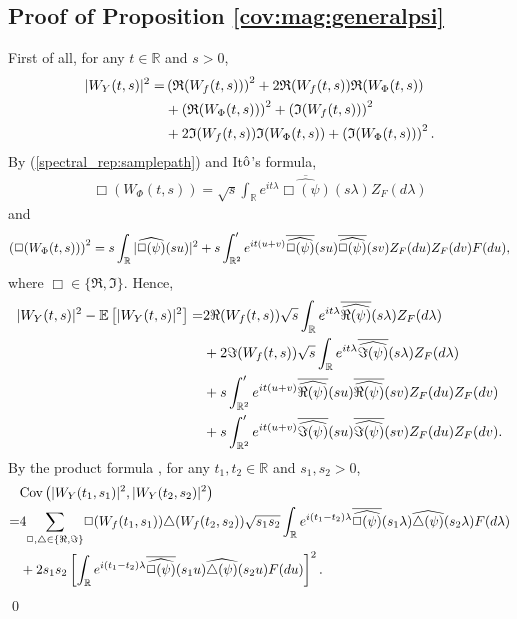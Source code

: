 \documentclass{amsart}
\begin{document}
\subsection{Proof of Proposition \ref{cov:mag:generalpsi}}\label{sec:proof:cov:mag:generalpsi}
First of all, for any $t\in \mathbb{R}$ and $s>0$,
\begin{align}\notag
|W_{Y}(t,s)|^2
=& \left(\mathfrak{R}(W_{f}(t,s))\right)^{2}+ 2\mathfrak{R}(W_{f}(t,s)) \mathfrak{R}(W_{\Phi}(t,s))
\\\notag&
+\left( \mathfrak{R}(W_{\Phi}(t,s))\right)^{2}
+\left(\mathfrak{I}(W_{f}(t,s))\right)^{2}
\\\notag&+ 2\mathfrak{I}(W_{f}(t,s)) \mathfrak{I}(W_{\Phi}(t,s))+\left( \mathfrak{I}(W_{\Phi}(t,s))\right)^{2}.
\end{align}
By (\ref{spectral_rep:samplepath}) and It$\hat{\textup{o}}$'s formula,
\begin{align*}%
\Box(W_{\Phi}(t,s))
= \sqrt{s}\int_{\mathbb{R}}e^{it\lambda} \overline{\widehat{\Box(\psi)}}(s\lambda)Z_{F}(d\lambda)
\end{align*}
and
\begin{align}\notag
\left(\Box(W_{\Phi}(t,s))\right)^2 = s\int_{\mathbb{R}}|\widehat{\Box(\psi)}(su)|^2
+s\int_{\mathbb{R}^{2}}'e^{it(u+v)} \overline{\widehat{\Box(\psi)}}(su)
\overline{\widehat{\Box(\psi)}}(sv)Z_{F}(du)Z_{F}(dv)
F(du),
\end{align}
where $\Box\in \{\Re,\Im\}.$
Hence,
\begin{align}\notag
|W_{Y}(t,s)|^2-\mathbb{E}\left[|W_{Y}(t,s)|^2\right]
=&
 2\Re(W_{f}(t,s))\sqrt{s}\int_{\mathbb{R}}e^{it\lambda} \overline{\widehat{\Re(\psi)}}(s\lambda)Z_{F}(d\lambda)
\\\notag&+ 2\Im(W_{f}(t,s))\sqrt{s}\int_{\mathbb{R}}e^{it\lambda} \overline{\widehat{\Im(\psi)}}(s\lambda)Z_{F}(d\lambda)
\\\notag&+s\int_{\mathbb{R}^{2}}'e^{it(u+v)} \overline{\widehat{\Re(\psi)}}(su)
\overline{\widehat{\Re(\psi)}}(sv)Z_{F}(du)Z_{F}(dv)
\\\notag&+s\int_{\mathbb{R}^{2}}'e^{it(u+v)} \overline{\widehat{\Im(\psi)}}(su)
\overline{\widehat{\Im(\psi)}}(sv)Z_{F}(du)Z_{F}(dv).
\end{align}
By the product formula \cite{major1981lecture,nourdin2012normal}, for any $t_{1},t_{2}\in \mathbb{R}$ and $s_{1},s_{2}>0$,
\begin{align}\notag
&\textup{Cov}\left(|W_{Y}(t_{1},s_{1})|^2, |W_{Y}(t_{2},s_{2})|^2\right)
\\\notag=&4\underset{\Box,\triangle \in \{\Re,\Im\}}{\sum} \Box(W_{f}(t_{1},s_{1}))\triangle(W_{f}(t_{2},s_{2}))
\sqrt{s_{1}s_{2}}\int_{\mathbb{R}}e^{i(t_{1}-t_{2})\lambda} \overline{\widehat{\Box(\psi)}}(s_{1}\lambda)\widehat{\triangle(\psi)}(s_{2}\lambda)F(d\lambda)
\\\notag&+2s_{1}s_{2}\left[\int_{\mathbb{R}}e^{i(t_{1}-t_{2})\lambda} \overline{\widehat{\Box(\psi)}}(s_{1}u)
\widehat{\triangle(\psi)}(s_{2}u)F(du)\right]^{2}.
\end{align}
\qed
\end{document}
